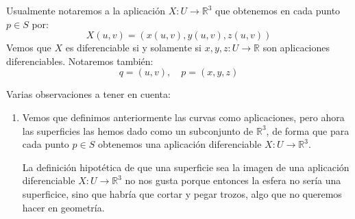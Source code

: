 \begin{notacion}
    Usualmente notaremos a la aplicación $X:U\to \mathbb{R}^3$ que obtenemos en cada punto $p\in S$ por:
    \begin{equation*}
        X(u,v) = (x(u,v), y(u,v), z(u,v))
    \end{equation*}
    Vemos que $X$ es diferenciable si y solamente si $x,y,z:U\to \mathbb{R}$ son aplicaciones diferenciables. Notaremos también:
    \begin{equation*}
        q = (u,v), \quad p = (x,y,z)
    \end{equation*}
\end{notacion}

\begin{observacion}
    Varias observaciones a tener en cuenta:
    \begin{enumerate}
        \item Vemos que definimos anteriormente las curvas como aplicaciones, pero ahora las superficies las hemos dado como un subconjunto de $\mathbb{R}^3$, de forma que para cada punto $p\in S$ obtenemos una aplicación diferenciable $X:U\to \mathbb{R}^3$.

            La definición hipotética de que una superficie sea la imagen de una aplicación diferenciable $X:U\to \mathbb{R}^3$ no nos gusta porque entonces la esfera no sería una superficice, sino que habría que cortar y pegar trozos, algo que no queremos hacer en geometría.


\end{enumerate}
\end{observacion}
